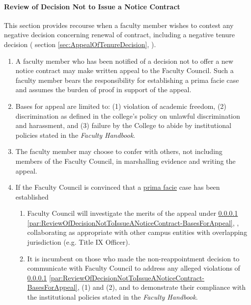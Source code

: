 			\paragraph{Review of Decision Not to Issue a Notice Contract}
				\label{sec:ReviewOfDecisionNotToIssueANoticeContract}
				This section provides recourse when a faculty member wishes to contest any negative decision concerning renewal of contract, including a negative tenure decision (
				section
				\ref{sec:AppealOfTenureDecision},
				).
				\begin{enumerate}[label=\alph*)]
					\item{A faculty member who has been notified of a decision not to offer a new notice contract may make written appeal to the Faculty Council.  Such a faculty member bears the responsibility for establishing a prima facie case and assumes the burden of proof in support of the appeal.}
					\item{
						\label{par:ReviewOfDecisionNotToIssueANoticeContract-BasesForAppeal}
						Bases for appeal are limited to: (1) violation of academic freedom, (2) discrimination as defined in the college's policy on unlawful discrimination and harassment, and (3) failure by the College to abide by institutional policies stated in the \emph{Faculty Handbook}.}
					\item{The faculty member may choose to confer with others, not including members of the Faculty Council, in marshalling evidence and writing the appeal.}
					\item{If the Faculty Council is convinced that a \underline{prima facie} case has been established
						\begin{enumerate}[label=\arabic*)]
							\item{Faculty Council will investigate the merits of the appeal
								under
								\ref{sec:ReviewOfDecisionNotToIssueANoticeContract}
								\ref{par:ReviewOfDecisionNotToIssueANoticeContract-BasesForAppeal},
								, collaborating as appropriate with other campus entities with overlapping jurisdiction (e.g. Title IX Officer).}
							\item{It is incumbent on those who made the non-reappointment decision to communicate with Faculty Council to address any alleged violations of
								\ref{sec:ReviewOfDecisionNotToIssueANoticeContract}
								\ref{par:ReviewOfDecisionNotToIssueANoticeContract-BasesForAppeal},
								(1) and (2), and to demonstrate their compliance with the institutional policies stated in the \emph{Faculty Handbook}.}

\end{enumerate}}
\end{enumerate}
